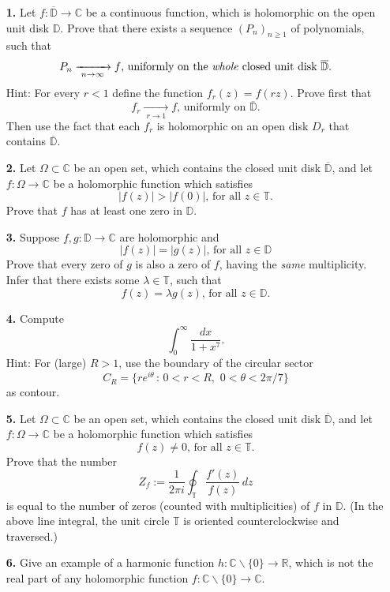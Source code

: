 \documentclass[12pt]{article}
\begin{document}
\begin{itemize}
\item[{\bf 1.}] Let $f:\overline{\mathbb{D}}\to\mathbb{C}$ be a continuous
function, which is holomorphic on the open unit disk $\mathbb{D}$.
Prove that there exists a sequence $(P_n)_{n\geq 1}$ of polynomials, such that
$$P_n\xrightarrow[\,\,n\to\infty\,\,]{}f\text{, uniformly on the {\em whole\/}
closed unit disk }\overline{\mathbb{D}}.$$
{\footnotesize
{\sc Hint:} For every $r<1$ define the function $f_r(z)=f(rz)$. Prove first
that
$$f_r\xrightarrow[\,\,r\to 1\,\,]{}f\text{, uniformly on }\overline{\mathbb{D}}.$$
Then use the fact that each $f_r$ is holomorphic on an open disk $D_r$ that
contains $\overline{\mathbb{D}}$.}

\item[{\bf 2.}]
Let $\Omega\subset\mathbb{C}$ be an open set,
which contains the closed unit disk $\overline{\mathbb{D}}$, and
let $f:\Omega\to\mathbb{C}$ be a holomorphic function which satisfies
$$
|f(z)|>|f(0)|\text{, for all }z\in\mathbb{T}.$$
Prove that $f$ has at least one zero in $\mathbb{D}$.

\item[{\bf 3.}]
Suppose $f,g:\mathbb{D}\to\mathbb{C}$ are holomorphic and
$$|f(z)|=|g(z)|\text{, for all }z\in\mathbb{D}$$
Prove that every zero of $g$ is also a zero of $f$, having the {\em same\/}
multiplicity. Infer that there exists some $\lambda\in\mathbb{T}$, such that
$$f(z)=\lambda g(z)\text{, for all }z\in\mathbb{D}.$$

\item[{\bf 4.}]
Compute
$$
\int_0^\infty \frac{dx}{1+x^7}.$$
{\footnotesize
{\sc Hint:} For (large) $R>1$, use the boundary of the circular sector
$$C_R=\{re^{i\theta}\,:\,0<r<R,\,\,0<\theta<2\pi/7\}$$
as contour.}

\item[{\bf 5.}] Let $\Omega\subset\mathbb{C}$ be an open set,
which contains the closed unit disk $\overline{\mathbb{D}}$, and
let $f:\Omega\to\mathbb{C}$ be a holomorphic function which satisfies
$$f(z)\neq 0\text{, for all }z\in\mathbb{T}.$$
Prove that the number
$$
Z_f:=\frac 1{2\pi i}\oint_{\mathbb{T}}\frac{f'(z)}{f(z)}\,dz$$
is equal to the number of zeros (counted with multiplicities)
of $f$ in $\mathbb{D}$. (In the above line
integral, the unit circle $\mathbb{T}$ is
oriented counterclockwise and traversed.)


\item[{\bf 6.}] Give an example of a harmonic function $h:\mathbb{C}\smallsetminus\{0\}
\to\mathbb{R}$, which is not the real part of any holomorphic function
$f:\mathbb{C}\smallsetminus\{0\}\to\mathbb{C}$.


\end{itemize}
\end{document}
